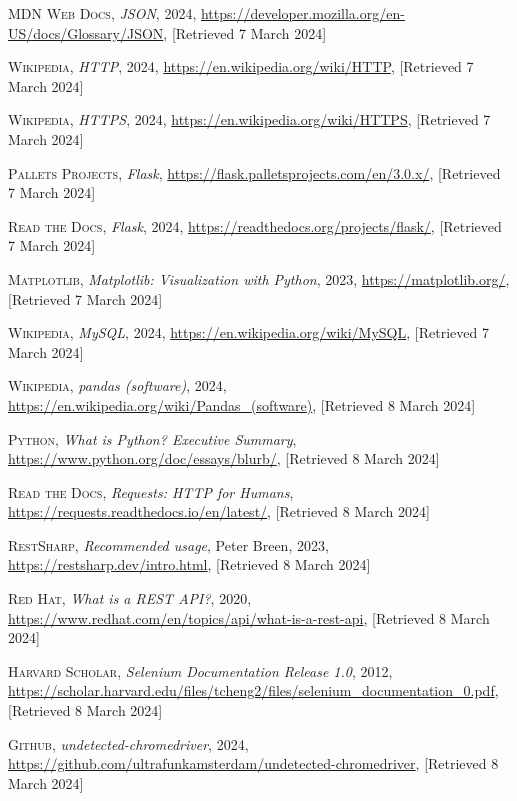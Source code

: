 \documentclass{thesis-ekf}
\theoremstyle{definition}
\theoremstyle{remark}
\begin{document}
\begin{thebibliography}{2}
\textsc{MDN Web Docs},
\emph{JSON}, 2024,
\url{https://developer.mozilla.org/en-US/docs/Glossary/JSON}, [Retrieved 7 March 2024]

\textsc{Wikipedia},
\emph{HTTP}, 2024,
\url{https://en.wikipedia.org/wiki/HTTP}, [Retrieved 7 March 2024]

\textsc{Wikipedia},
\emph{HTTPS}, 2024,
\url{https://en.wikipedia.org/wiki/HTTPS}, [Retrieved 7 March 2024]

\textsc{Pallets Projects},
\emph{Flask}, 
\url{https://flask.palletsprojects.com/en/3.0.x/}, [Retrieved 7 March 2024]

\textsc{Read the Docs},
\emph{Flask}, 2024,
\url{https://readthedocs.org/projects/flask/}, [Retrieved 7 March 2024]

\textsc{Matplotlib}, 
\emph{Matplotlib: Visualization with Python}, 2023,
\url{https://matplotlib.org/}, [Retrieved 7 March 2024]

\textsc{Wikipedia},
\emph{MySQL}, 2024,
\url{https://en.wikipedia.org/wiki/MySQL}, [Retrieved 7 March 2024]

\textsc{Wikipedia},
\emph{pandas (software)}, 2024,
\url{https://en.wikipedia.org/wiki/Pandas_(software)}, [Retrieved 8 March 2024]

\textsc{Python},
\emph{What is Python? Executive Summary},
\url{https://www.python.org/doc/essays/blurb/}, [Retrieved 8 March 2024]

\textsc{Read the Docs},
\emph{Requests: HTTP for Humans},
\url{https://requests.readthedocs.io/en/latest/}, [Retrieved 8 March 2024]

\textsc{RestSharp},
\emph{Recommended usage}, Peter Breen, 2023,
\url{https://restsharp.dev/intro.html}, [Retrieved 8 March 2024]

\textsc{Red Hat},
\emph{What is a REST API?}, 2020, 
\url{https://www.redhat.com/en/topics/api/what-is-a-rest-api}, [Retrieved 8 March 2024]

\textsc{Harvard Scholar},
\emph{Selenium Documentation Release 1.0}, 2012, 
\url{https://scholar.harvard.edu/files/tcheng2/files/selenium_documentation_0.pdf}, [Retrieved 8 March 2024]

\textsc{Github},
\emph{undetected-chromedriver}, 2024, 
\url{https://github.com/ultrafunkamsterdam/undetected-chromedriver}, [Retrieved 8 March 2024]


\end{thebibliography}
\end{document}
